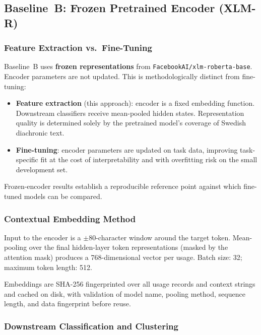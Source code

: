 \subsection{Baseline~B: Frozen Pretrained Encoder (XLM-R)}

\subsubsection{Feature Extraction vs.\ Fine-Tuning}

Baseline~B uses \textbf{frozen representations} from
\texttt{FacebookAI/xlm-roberta-base}.  Encoder parameters are not updated.
This is methodologically distinct from fine-tuning:
\begin{itemize}
  \item \textbf{Feature extraction} (this approach): encoder is a fixed
    embedding function.  Downstream classifiers receive mean-pooled hidden
    states.  Representation quality is determined solely by the pretrained
    model's coverage of Swedish diachronic text.
  \item \textbf{Fine-tuning}: encoder parameters are updated on task data,
    improving task-specific fit at the cost of interpretability and with
    overfitting risk on the small development set.
\end{itemize}
Frozen-encoder results establish a reproducible reference point against which
fine-tuned models can be compared.

\subsubsection{Contextual Embedding Method}

Input to the encoder is a $\pm80$-character window around the target token.
Mean-pooling over the final hidden-layer token representations (masked by the
attention mask) produces a 768-dimensional vector per usage.  Batch size: 32;
maximum token length: 512.

Embeddings are SHA-256 fingerprinted over all usage records and context strings
and cached on disk, with validation of model name, pooling method, sequence
length, and data fingerprint before reuse.

\subsubsection{Downstream Classification and Clustering}

